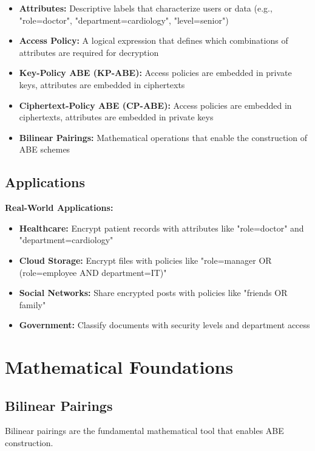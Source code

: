 \documentclass[11pt,a4paper]{article}
\begin{document}
\begin{itemize}
    \item \textbf{Attributes:} Descriptive labels that characterize users or data (e.g., "role=doctor", "department=cardiology", "level=senior")
    \item \textbf{Access Policy:} A logical expression that defines which combinations of attributes are required for decryption
    \item \textbf{Key-Policy ABE (KP-ABE):} Access policies are embedded in private keys, attributes are embedded in ciphertexts
    \item \textbf{Ciphertext-Policy ABE (CP-ABE):} Access policies are embedded in ciphertexts, attributes are embedded in private keys
    \item \textbf{Bilinear Pairings:} Mathematical operations that enable the construction of ABE schemes
\end{itemize}

\subsection{Applications}

\begin{examplebox}
\textbf{Real-World Applications:}
\begin{itemize}
    \item \textbf{Healthcare:} Encrypt patient records with attributes like "role=doctor" and "department=cardiology"
    \item \textbf{Cloud Storage:} Encrypt files with policies like "role=manager OR (role=employee AND department=IT)"
    \item \textbf{Social Networks:} Share encrypted posts with policies like "friends OR family"
    \item \textbf{Government:} Classify documents with security levels and department access
\end{itemize}
\end{examplebox}

\section{Mathematical Foundations}

\subsection{Bilinear Pairings}

Bilinear pairings are the fundamental mathematical tool that enables ABE construction.
\end{document}

